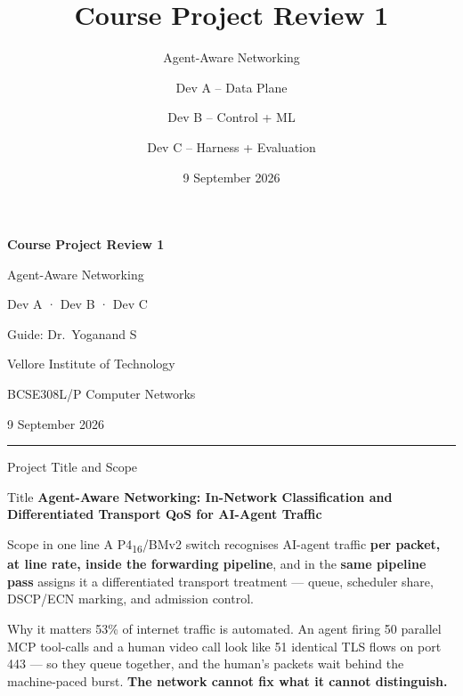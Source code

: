 \documentclass[aspectratio=169,11pt]{beamer}
\title[Course Project Review 1]{Course Project Review 1}
\subtitle{Agent-Aware Networking}
\author{Dev A -- Data Plane \and Dev B -- Control + ML \and Dev C -- Harness + Evaluation}
\institute{Vellore Institute of Technology}
\date{9 September 2026}
\begin{document}
{
\begin{frame}[plain]
  \vfill
  \centering
  {\color{deckNavy}\bfseries\Huge Course Project Review 1\par}
  \vspace{1.2em}
  {\large Agent-Aware Networking\par}
  \vspace{0.9em}
  {\normalsize Dev A · Dev B · Dev C\par}
  \vspace{0.5em}
  {\small Guide: Dr.\ Yoganand S\par}
  \vspace{0.5em}
  {\footnotesize Vellore Institute of Technology\par}
  \vspace{0.4em}
  {\footnotesize BCSE308L/P Computer Networks\par}
  \vspace{1.0em}
  {\color{deckNavy}9 September 2026\par}
  \vfill
  \begin{center}\color{deckTeal}\rule{0.45\textwidth}{1.2pt}\end{center}
  \vspace{1em}
\end{frame}}

\begin{frame}{Project Title and Scope}
  \begin{block}{Title}
    \textbf{Agent-Aware Networking: In-Network Classification and Differentiated
    Transport QoS for AI-Agent Traffic}
  \end{block}
  \begin{alertblock}{Scope in one line}
    A P4\textsubscript{16}/BMv2 switch recognises AI-agent traffic \textbf{per packet, at line
    rate, inside the forwarding pipeline}, and in the \textbf{same pipeline pass} assigns it a
    differentiated transport treatment --- queue, scheduler share, DSCP/ECN marking, and
    admission control.
  \end{alertblock}
  \begin{exampleblock}{Why it matters}
    53\% of internet traffic is automated. An agent firing 50 parallel MCP tool-calls and a human
    video call look like 51 identical TLS flows on port 443 --- so they queue together, and the
    human's packets wait behind the machine-paced burst.
    \textbf{The network cannot fix what it cannot distinguish.}
  \end{exampleblock}
\end{frame}
\end{document}

